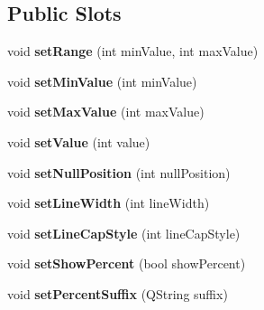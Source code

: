 \subsection*{Public Slots}
\begin{DoxyCompactItemize}
\item 
\mbox{\label{class_q_qt_custom_progress_bar_aa7a0396bc86988708e5222e918a8fbb2}} 
void {\bfseries set\+Range} (int min\+Value, int max\+Value)
\item 
\mbox{\label{class_q_qt_custom_progress_bar_a7eb4a86ce90da6aec276917668db7803}} 
void {\bfseries set\+Min\+Value} (int min\+Value)
\item 
\mbox{\label{class_q_qt_custom_progress_bar_aed7e40fa34721502a535a89dc22eccca}} 
void {\bfseries set\+Max\+Value} (int max\+Value)
\item 
\mbox{\label{class_q_qt_custom_progress_bar_aafc5aa1f23a628539d6636e5544df728}} 
void {\bfseries set\+Value} (int value)
\item 
\mbox{\label{class_q_qt_custom_progress_bar_ab349ac64a547510b938e7452c6c050af}} 
void {\bfseries set\+Null\+Position} (int null\+Position)
\item 
\mbox{\label{class_q_qt_custom_progress_bar_afb252300732a574968275827c8314f65}} 
void {\bfseries set\+Line\+Width} (int line\+Width)
\item 
\mbox{\label{class_q_qt_custom_progress_bar_a56066715f5d700cebd49c608d435dac2}} 
void {\bfseries set\+Line\+Cap\+Style} (int line\+Cap\+Style)
\item 
\mbox{\label{class_q_qt_custom_progress_bar_ad6e95408f93cae342643e19f20fac569}} 
void {\bfseries set\+Show\+Percent} (bool show\+Percent)
\item 
\mbox{\label{class_q_qt_custom_progress_bar_a29ff33f1ad3d85bb1fd4061aa1e10ae6}} 
void {\bfseries set\+Percent\+Suffix} (Q\+String suffix)
\item 

\end{DoxyCompactItemize}

